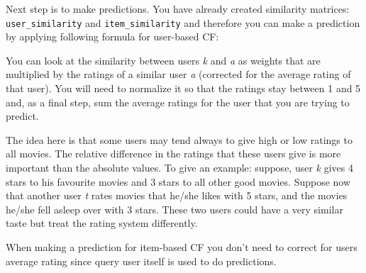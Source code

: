 \documentclass[11pt]{article}
\begin{document}
    Next step is to make predictions. You have already created similarity
matrices: \texttt{user\_similarity} and \texttt{item\_similarity} and
therefore you can make a prediction by applying following formula for
user-based CF:

You can look at the similarity between users \emph{k} and \emph{a} as
weights that are multiplied by the ratings of a similar user \emph{a}
(corrected for the average rating of that user). You will need to
normalize it so that the ratings stay between 1 and 5 and, as a final
step, sum the average ratings for the user that you are trying to
predict.

The idea here is that some users may tend always to give high or low
ratings to all movies. The relative difference in the ratings that these
users give is more important than the absolute values. To give an
example: suppose, user \emph{k} gives 4 stars to his favourite movies
and 3 stars to all other good movies. Suppose now that another user
\emph{t} rates movies that he/she likes with 5 stars, and the movies
he/she fell asleep over with 3 stars. These two users could have a very
similar taste but treat the rating system differently.

When making a prediction for item-based CF you don't need to correct for
users average rating since query user itself is used to do predictions.
\end{document}
